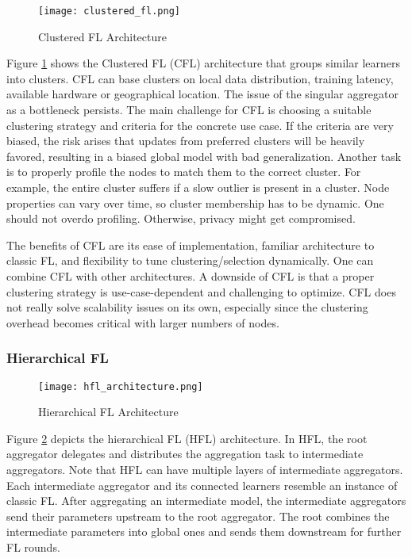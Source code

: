 \begin{figure}[h]
    \centering
    \texttt{[image: clustered\_fl.png]}
    \caption{Clustered FL Architecture}
    \label{fig:clustered_fl}
\end{figure}
Figure \ref{fig:clustered_fl} shows the Clustered FL (CFL) architecture
that groups similar learners into clusters.
CFL can base clusters on local data distribution, training latency,
available hardware or geographical location.
The issue of the singular aggregator as a bottleneck persists.
The main challenge for CFL is choosing a suitable clustering strategy
and criteria for the concrete use case.
If the criteria are very biased, the risk arises that updates from preferred clusters
will be heavily favored, resulting in a biased global model with bad generalization.
Another task is to properly profile the nodes to match them to the correct cluster.
For example, the entire cluster suffers if a slow outlier is present in a cluster.
Node properties can vary over time, so cluster membership has to be dynamic.
One should not overdo profiling.
Otherwise, privacy might get compromised.

The benefits of CFL are its ease of implementation,
familiar architecture to classic FL,
and flexibility to tune clustering/selection dynamically.
One can combine CFL with other architectures.
A downside of CFL is that a proper clustering strategy is 
use-case-dependent and challenging to optimize.
CFL does not really solve scalability issues on its own,
especially since the clustering overhead becomes critical with larger numbers of nodes.

\subsubsection{Hierarchical FL}
\begin{figure}[h]
    \centering
    \texttt{[image: hfl\_architecture.png]}
    \caption{Hierarchical FL Architecture}
    \label{fig:hfl_architecture}
\end{figure}
Figure \ref{fig:hfl_architecture} depicts the hierarchical FL (HFL) architecture.
In HFL, the root aggregator delegates and distributes the aggregation task to 
intermediate aggregators.
Note that HFL can have multiple layers of intermediate aggregators.
Each intermediate aggregator and its connected learners resemble an instance of classic FL.
After aggregating an intermediate model, the intermediate aggregators send their parameters
upstream to the root aggregator.
The root combines the intermediate parameters into global ones and sends them downstream for further FL rounds.

